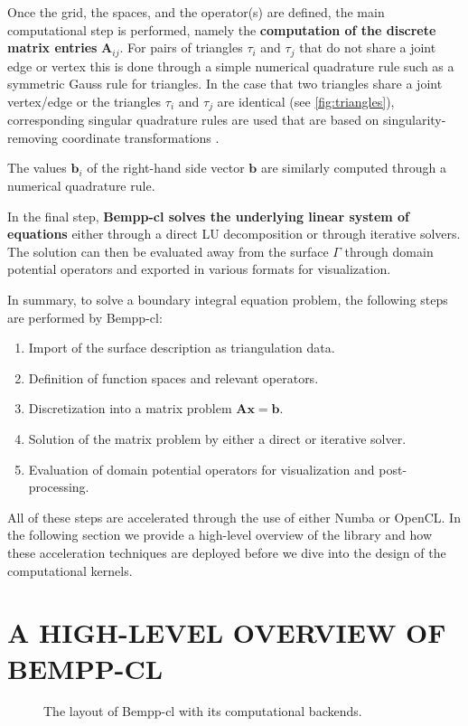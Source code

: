 \documentclass{IEEEcsmag}
\newcommand{\dmat}[1]{\mathbf{#1}}
\newcommand{\dvec}[1]{\mathbf{#1}}
\begin{document}
Once the grid, the spaces, and the operator(s) are defined, the main computational step is performed, namely the \textbf{computation of the discrete matrix entries} $\dmat{A}_{ij}$. For pairs of triangles $\tau_i$ and $\tau_j$ that do not share a joint edge or vertex this is done through a simple numerical quadrature rule such as a symmetric Gauss rule for triangles. In the case that two triangles share a joint vertex/edge or the triangles $\tau_i$ and $\tau_j$ are identical (see \cref{fig:triangles}), corresponding singular quadrature rules are used that are based on singularity-removing coordinate transformations \cite{erichsen}.

The values $\dvec{b}_i$ of the right-hand side vector $\dvec{b}$ are similarly computed through a numerical quadrature rule.

In the final step, \textbf{Bempp-cl solves the underlying linear system of equations} either through a direct LU decomposition or through iterative solvers. The solution can then be evaluated away from the surface $\Gamma$ through domain potential operators and exported in various formats for visualization.

In summary, to solve a boundary integral equation problem, the following steps are performed by Bempp-cl:
\begin{enumerate}
	\item Import of the surface description as triangulation data.
	\item Definition of function spaces and relevant operators.
	\item Discretization into a matrix problem $\dmat{A}\dvec{x}=\dvec{b}$.
	\item Solution of the matrix problem by either a direct or iterative solver.
	\item Evaluation of domain potential operators for visualization and post-processing.
\end{enumerate}

All of these steps are accelerated through the use of either Numba or OpenCL. In the following section we provide a high-level overview of the library and how these acceleration techniques are deployed before we dive into the design of the computational kernels.

\section{A HIGH-LEVEL OVERVIEW OF BEMPP-CL}

\begin{figure}
	\centering
	
	\caption{The layout of Bempp-cl with its computational backends.}
	\label{fig:overview}
\end{figure}
\end{document}
